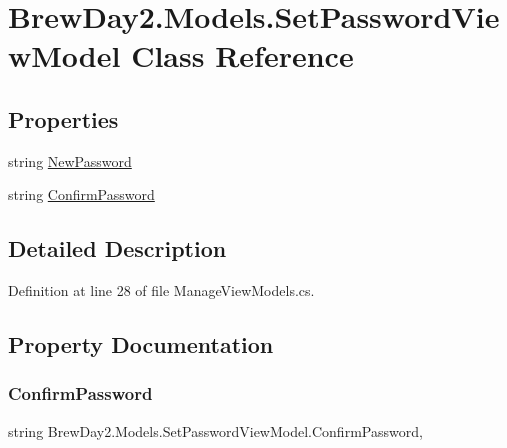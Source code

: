 \hypertarget{class_brew_day2_1_1_models_1_1_set_password_view_model}{}\section{Brew\+Day2.\+Models.\+Set\+Password\+View\+Model Class Reference}
\label{class_brew_day2_1_1_models_1_1_set_password_view_model}
\subsection*{Properties}
\begin{DoxyCompactItemize}
\item 
string \mbox{\hyperlink{class_brew_day2_1_1_models_1_1_set_password_view_model_a9003c09107a247fe17f123205eec0c77}{New\+Password}}
\item 
string \mbox{\hyperlink{class_brew_day2_1_1_models_1_1_set_password_view_model_ac6ef1ff0e7a4f512a2ccc78499d1f70d}{Confirm\+Password}}
\end{DoxyCompactItemize}


\subsection{Detailed Description}


Definition at line 28 of file Manage\+View\+Models.\+cs.



\subsection{Property Documentation}
\mbox{\label{class_brew_day2_1_1_models_1_1_set_password_view_model_ac6ef1ff0e7a4f512a2ccc78499d1f70d}} 
\subsubsection{\texorpdfstring{Confirm\+Password}{ConfirmPassword}}
{\footnotesize\ttfamily string Brew\+Day2.\+Models.\+Set\+Password\+View\+Model.\+Confirm\+Password\hspace{0.3cm}{\ttfamily [get]}, {\ttfamily [set]}}



